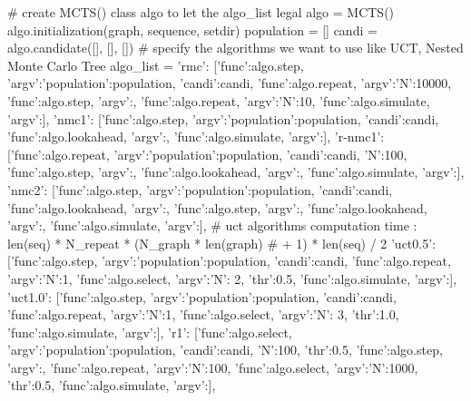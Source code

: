\documentclass{article}
\begin{document}
\begin{python}[moreemph={[4]42},caption={A General Framework of MCTS based on Python},label=ex1]
    # create MCTS() class algo to let the algo_list legal
    algo = MCTS()
    algo.initialization(graph, sequence, setdir)
    population = []
    candi = algo.candidate([], [], [])
    # specify the algorithms we want to use like UCT, Nested Monte Carlo Tree
    algo_list = {
       'rmc': [{'func':algo.step, 'argv':{'population':population, 'candi':candi}},
               {'func':algo.repeat, 'argv':{'N':10000}}, {'func':algo.step, 'argv':{}},
               {'func':algo.repeat, 'argv':{'N':10}}, {'func':algo.simulate, 'argv':{}}],
       'nmc1': [{'func':algo.step, 'argv':{'population':population, 'candi':candi}},
                {'func':algo.lookahead, 'argv':{}}, {'func':algo.simulate, 'argv':{}}],
       'r-nmc1': [{'func':algo.repeat, 'argv':{'population':population, 'candi':candi, 'N':100}},
                  {'func':algo.step, 'argv':{}}, {'func':algo.lookahead, 'argv':{}},
                  {'func':algo.simulate, 'argv':{}}],                
       'nmc2': [{'func':algo.step, 'argv':{'population':population, 'candi':candi}},
                {'func':algo.lookahead, 'argv':{}}, {'func':algo.step, 'argv':{}},
                {'func':algo.lookahead, 'argv':{}}, {'func':algo.simulate, 'argv':{}}],
        # uct algorithms computation time : len(seq) * N_repeat * (N_graph * len(graph)
        # + 1) * len(seq) / 2
       'uct0.5': [{'func':algo.step, 'argv':{'population':population, 'candi':candi}},
                  {'func':algo.repeat, 'argv':{'N':1}},
                  {'func':algo.select, 'argv':{'N': 2, 'thr':0.5}},
                  {'func':algo.simulate, 'argv':{}}],
       'uct1.0': [{'func':algo.step, 'argv':{'population':population, 'candi':candi}},
                  {'func':algo.repeat, 'argv':{'N':1}},
                  {'func':algo.select, 'argv':{'N': 3, 'thr':1.0}},
                  {'func':algo.simulate, 'argv':{}}],                 
       'r1': [{'func':algo.select, 'argv':{'population':population, 'candi':candi, 'N':100, 'thr':0.5}},
              {'func':algo.step, 'argv':{}}, {'func':algo.repeat, 'argv':{'N':100}},
              {'func':algo.select, 'argv':{'N':1000, 'thr':0.5}},
              {'func':algo.simulate, 'argv':{}}],
    }
    

\end{python}
\end{document}
